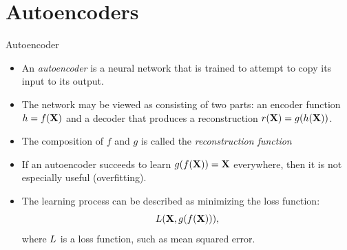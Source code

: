 \documentclass[handout,xcolor=pdftex,dvipsnames,table,mathserif]{beamer}
\begin{document}
\section{Autoencoders}
\begin{frame}{Autoencoder}
\begin{itemize}
\item An \emph{autoencoder} is a neural network that is trained to attempt to copy its input to its output.
\item The network may be viewed as consisting of two parts: an
encoder function $h = f (\mathbf{X})$ and a decoder that produces a reconstruction $r(\mathbf{X}) = g(h(\mathbf{X}))$.
\item The composition of $f$ and $g$ is called the \emph{reconstruction function}
\item If an autoencoder succeeds to learn $g(f (\mathbf{X})) = \mathbf{X}$ everywhere, then it is not especially useful (overfitting).
\item The learning process can be described as minimizing the loss function:
\begin{equation}
L ( \mathbf{X} , g(f(\mathbf{X}))),
\end{equation}
where $L$ is a loss function, such as mean squared error.
\end{itemize}
\begin{figure}
\centering
{}
\end{figure}
\end{frame}
\end{document}
